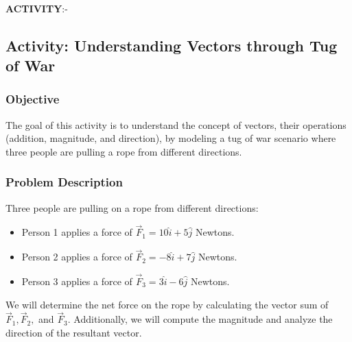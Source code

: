 \documentclass{report}
\begin{document}
\setlength{\parskip}{1em}
\ 
\ 


\textbf{ACTIVITY}:-


\subsection{Activity: Understanding Vectors through Tug of War}
\subsubsection*{Objective}
The goal of this activity is to understand the concept of vectors, their operations (addition, magnitude, and direction), by modeling a tug of war scenario where three people are pulling a rope from different directions.

\subsubsection*{Problem Description}
Three people are pulling on a rope from different directions:
\begin{itemize}
    \item Person 1 applies a force of \( \vec{F}_1 = 10 \hat{i} + 5 \hat{j} \) Newtons.
    \item Person 2 applies a force of \( \vec{F}_2 = -8 \hat{i} + 7 \hat{j} \) Newtons.
    \item Person 3 applies a force of \( \vec{F}_3 = 3 \hat{i} - 6 \hat{j} \) Newtons.
\end{itemize}

We will determine the net force on the rope by calculating the vector sum of \( \vec{F}_1, \vec{F}_2, \) and \( \vec{F}_3 \). Additionally, we will compute the magnitude and analyze the direction of the resultant vector.
\end{document}

